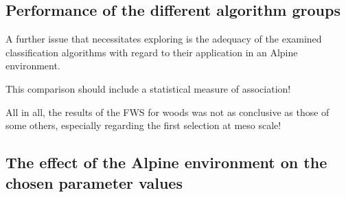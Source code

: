 \documentclass[final,1p,times,twocolumn,authoryear]{elsarticle}
\begin{document}
\subsection{Performance of the different algorithm groups} 
A further issue that necessitates exploring is the adequacy of the examined classification algorithms with regard to their application in an Alpine environment. 

This comparison should include a statistical measure of association!

All in all, the results of the FWS for woods was not as conclusive as those of some others, especially regarding the first selection at meso scale!
\subsection{The effect of the Alpine environment on the chosen parameter values} 
\end{document}
